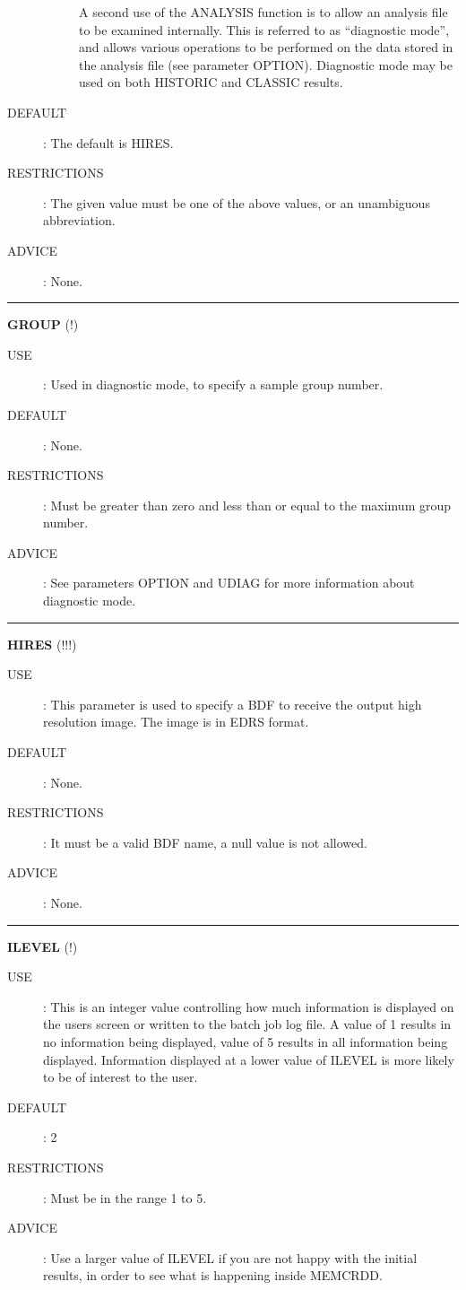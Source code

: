 \begin{description}
\begin{description}
A second use of the ANALYSIS function is to allow an analysis file to be 
examined internally. This is referred to as ``diagnostic mode'', and allows
various operations to be performed on the data stored in the analysis file
(see parameter OPTION).
Diagnostic mode may be used on both HISTORIC and CLASSIC results.
\end{description}

\item [DEFAULT]:
The default is HIRES.
\item [RESTRICTIONS]:
The given value must be one of the above values, or an unambiguous abbreviation.
\item [ADVICE]:
None.
\end {description}

\rule{\textwidth}{0.3mm}
{\Large {\bf GROUP} (!)}
\begin{description}
\item [USE]:
Used in diagnostic mode, to specify a sample group number.
\item [DEFAULT]:
None.
\item [RESTRICTIONS]:
Must be greater than zero and less than or equal to the maximum group number.
\item [ADVICE]:
See parameters OPTION and UDIAG for more information about diagnostic mode.
\end {description}

\rule{\textwidth}{0.3mm}
{\Large {\bf HIRES} (!!!)}
\begin{description}
\item [USE]:
This parameter is used to specify a BDF to receive the output high resolution 
image. The image is in EDRS format.
\item [DEFAULT]:
None.
\item [RESTRICTIONS]:
It must be a valid BDF name, a null value is not allowed.
\item [ADVICE]:
None.
\end {description}

\rule{\textwidth}{0.3mm}
{\Large {\bf ILEVEL} (!)}
\begin{description}
\item [USE]:
This is an integer value controlling how much information is displayed on the 
users screen or written to the batch job log file. A value of 1 results in no
information being displayed, value of 5 results in all information being 
displayed. Information displayed at a lower value of ILEVEL is more likely to
be of interest to the user.
\item [DEFAULT]:
2
\item [RESTRICTIONS]:
Must be in the range 1 to 5.
\item [ADVICE]:
Use a larger value of ILEVEL if you are not happy with the initial results, in
order to see what is happening inside MEMCRDD.
\end {description}

